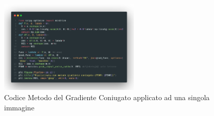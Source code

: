 \begin{figure}[H]
  \centering
    \includegraphics[width=0.6\textwidth]{imgCode/metGradCon.png}
    \caption{Codice Metodo del Gradiente Coniugato applicato ad una singola immagine}
    \label{fig:codeMGC}
\end{figure}

